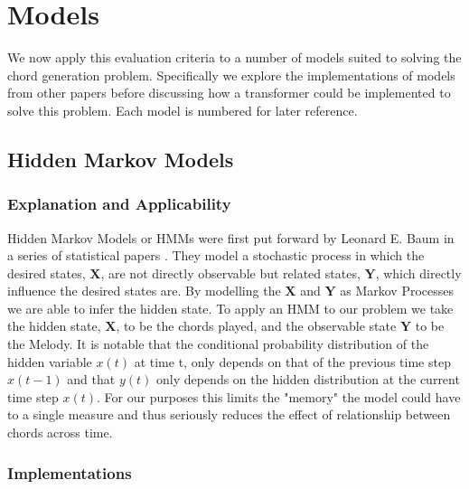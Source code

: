 \section{Models}

We now apply this evaluation criteria to a number of models suited to solving the chord generation problem. 
Specifically we explore the implementations of models from other papers before discussing how a transformer could be implemented to solve this problem.
Each model is numbered for later reference.

\subsection{Hidden Markov Models}
\label{subsec:HMM}
\subsubsection{Explanation and Applicability}
Hidden Markov Models or HMMs were first put forward by Leonard E. Baum in a series of statistical papers \cite{HMM1} \cite{HMM2} \cite{HMM3}. 
They model a stochastic process in which the desired states, $\boldsymbol{X}$, are not directly observable but related states, $\boldsymbol{Y}$, which directly influence the desired states are. 
By modelling the $\boldsymbol{X}$ and $\boldsymbol{Y}$ as Markov Processes 
we are able to infer the hidden state.
To apply an HMM to our problem we take the hidden state, $\boldsymbol{X}$, to be the chords played, and the observable state $\boldsymbol{Y}$ to be the Melody.
It is notable that the conditional probability distribution of the hidden variable $x(t)$ at time t, only depends on that of the previous time step $x(t-1)$ and that $y(t)$ only depends on the hidden distribution at the current time step $x(t)$.
For our purposes this limits the "memory" the model could have to a single measure and thus seriously reduces the effect of relationship between chords across time.

\subsubsection{Implementations}

